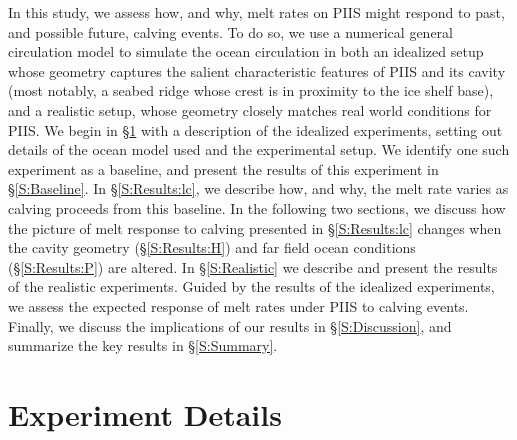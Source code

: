 \documentclass[draft]{agujournal2019}
\begin{document}
In this study, we assess how, and why, melt rates on PIIS might respond to past, and possible future, calving events. To do so, we use a numerical general circulation model to simulate the ocean circulation in both an idealized setup whose geometry captures the salient characteristic features of PIIS and its cavity (most notably, a seabed ridge whose crest is in proximity to the ice shelf base), and a realistic setup, whose geometry closely matches real world conditions for PIIS. We begin in \S\ref{S:Experiment} with a description of the idealized experiments, setting out details of the ocean model used and the experimental setup. We identify one such experiment as a baseline, and present the results of this experiment in \S\ref{S:Baseline}. In \S\ref{S:Results:lc}, we describe how, and why, the melt rate varies as calving proceeds from this baseline. In the following two sections, we discuss how the picture of melt response to calving presented in \S\ref{S:Results:lc} changes when the cavity geometry (\S\ref{S:Results:H}) and far field ocean conditions (\S\ref{S:Results:P}) are altered. In \S\ref{S:Realistic} we describe and present the results of  the realistic experiments. Guided by the results of the idealized experiments, we assess the expected response of melt rates under PIIS to calving events. Finally, we discuss the implications of our results in \S\ref{S:Discussion}, and summarize the key results in \S\ref{S:Summary}.


\section{Experiment Details}\label{S:Experiment}
\end{document}
